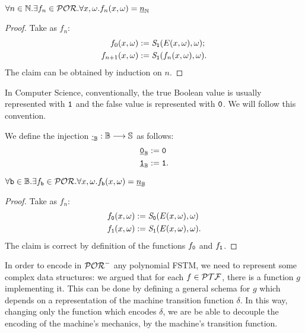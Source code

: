 \begin{remark}
  $\forall n \in \mathbb{N}. \exists f_n \in \mathcal{POR}. \forall x, \omega.
  f_n(x, \omega)= {\underline{n}}_{\mathbb{N}}$
\end{remark}
\begin{proof}
  Take as $f_n$:
  \begin{align*}
    {f_0}(x, \omega) &:= \emph{S}_{\mathtt{1}}(E(x, \omega),\omega); \\
    {f_{n+1}}(x, \omega)&:= \emph{S}_{\mathtt{1}}(f_n(x, \omega),\omega).
  \end{align*}
  The claim can be obtained by induction on $n$.
\end{proof}

In Computer Science, conventionally, the true Boolean value
is usually represented with $\mathtt{1}$ and
the false value is represented with $\mathtt{0}$.
We will follow this convention.

\begin{defn}
  We define the injection ${\underline{\cdot}}_{\mathbb{B}}:  \mathbb{B} \longrightarrow \mathbb{S}$
  as follows:
  \begin{align*}
    {\underline{\mathtt{0}}}_{\mathbb{B}} &:= \mathtt{0}\\
    {\underline{\mathtt{1}}}_{\mathbb{B}} &:= \mathtt{1}.
  \end{align*}
\end{defn}

\begin{remark}
  $\forall \mathtt{b} \in \mathbb{B}. \exists f_{\mathtt{b}} \in \mathcal{POR}. \forall x, \omega.
  f_{\mathtt{b}}(x, \omega)= {\underline{n}}_{\mathbb{B}}$
\end{remark}
\begin{proof}
  Take as $f_n$:
  \begin{align*}
    {f_{\mathtt{0}}}(x, \omega)&:= \emph{S}_{\mathtt{0}}(E(x, \omega),\omega)\\
    {f_{\mathtt{1}}}(x, \omega) &:= \emph{S}_{\mathtt{1}}(E(x, \omega),\omega).
  \end{align*}
  The claim is correct by definition of the functions $f_{\mathtt{0}}$ and $f_{\mathtt{1}}$.
\end{proof}


In order to encode in $\mathcal{POR}^-$ any polynomial FSTM,
we need to represent some complex data structures: we argued
that for each $f \in \mathcal{PTF}$, there is a function $g$ implementing it.
This can be done by defining a general schema for $g$ which depends
on a representation of the machine transition function $\delta$. In
this way, changing only the function which encodes $\delta$, we are be able to
decouple the encoding of the machine's mechanics, by the machine's transition function.

